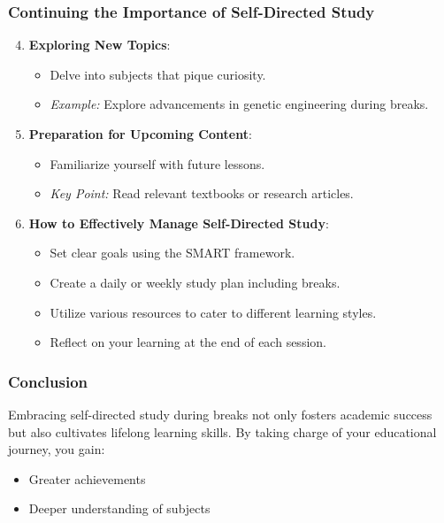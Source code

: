\documentclass[aspectratio=169]{beamer}
\begin{document}
\begin{frame}[fragile]
    \frametitle{Continuing the Importance of Self-Directed Study}
    \begin{enumerate}
        \setcounter{enumi}{3}
        \item \textbf{Exploring New Topics}:
            \begin{itemize}
                \item Delve into subjects that pique curiosity.
                \item \textit{Example:} Explore advancements in genetic engineering during breaks.
            \end{itemize}
        \item \textbf{Preparation for Upcoming Content}:
            \begin{itemize}
                \item Familiarize yourself with future lessons.
                \item \textit{Key Point:} Read relevant textbooks or research articles.
            \end{itemize}
        \item \textbf{How to Effectively Manage Self-Directed Study}:
            \begin{itemize}
                \item Set clear goals using the SMART framework.
                \item Create a daily or weekly study plan including breaks.
                \item Utilize various resources to cater to different learning styles.
                \item Reflect on your learning at the end of each session.
            \end{itemize}
    \end{enumerate}
\end{frame}

\begin{frame}[fragile]
    \frametitle{Conclusion}
    Embracing self-directed study during breaks not only fosters academic success but also cultivates lifelong learning skills. By taking charge of your educational journey, you gain:
    \begin{itemize}
        \item Greater achievements
        \item Deeper understanding of subjects
    \end{itemize}
\end{frame}
\end{document}
